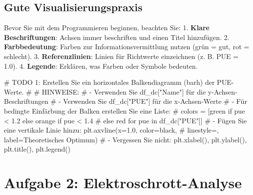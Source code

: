 \documentclass[
  nswissgerman,
  a4paper,
  DIV=11,
  numbers=noendperiod,
  ngerman]{scrreprt}
\newenvironment{Shaded}{\begin{snugshade}}{\end{snugshade}}
\newcommand{\AlertTok}[1]{\textcolor[rgb]{0.68,0.00,0.00}{#1}}
\newcommand{\CommentTok}[1]{\textcolor[rgb]{0.37,0.37,0.37}{#1}}
\begin{document}
\subsection{Gute
Visualisierungspraxis}\label{gute-visualisierungspraxis}

Bevor Sie mit dem Programmieren beginnen, beachten Sie: 1. \textbf{Klare
Beschriftungen}: Achsen immer beschriften und einen Titel hinzufügen. 2.
\textbf{Farbbedeutung}: Farben zur Informationsvermittlung nutzen (grün
= gut, rot = schlecht). 3. \textbf{Referenzlinien}: Linien für
Richtwerte einzeichnen (z. B. PUE = 1.0). 4. \textbf{Legende}: Erklären,
was Farben oder Symbole bedeuten.

\begin{Shaded}
\begin{Highlighting}[numbers=left,,]

\CommentTok{\# }\AlertTok{TODO}\CommentTok{ 1: Erstellen Sie ein horizontales Balkendiagramm (barh) der PUE{-}Werte.}
\CommentTok{\#}
\CommentTok{\# HINWEISE:}
\CommentTok{\# {-} Verwenden Sie df\_dc["Name"] für die y{-}Achsen{-}Beschriftungen}
\CommentTok{\# {-} Verwenden Sie df\_dc["PUE"] für die x{-}Achsen{-}Werte}
\CommentTok{\# {-} Für bedingte Einfärbung der Balken erstellen Sie eine Liste:}
\CommentTok{\#   colors = [\textquotesingle{}green\textquotesingle{} if pue \textless{} 1.2 else \textquotesingle{}orange\textquotesingle{} if pue \textless{} 1.4}
\CommentTok{\#             else \textquotesingle{}red\textquotesingle{} for pue in df\_dc["PUE"]]}
\CommentTok{\# {-} Fügen Sie eine vertikale Linie hinzu: plt.axvline(x=1.0, color=\textquotesingle{}black\textquotesingle{},}
\CommentTok{\#   linestyle=\textquotesingle{}{-}{-}\textquotesingle{}, label=\textquotesingle{}Theoretisches Optimum\textquotesingle{})}
\CommentTok{\# {-} Vergessen Sie nicht: plt.xlabel(), plt.ylabel(), plt.title(), plt.legend()}
\end{Highlighting}
\end{Shaded}

\section{Aufgabe 2:
Elektroschrott-Analyse}\label{aufgabe-2-elektroschrott-analyse}
\end{document}
